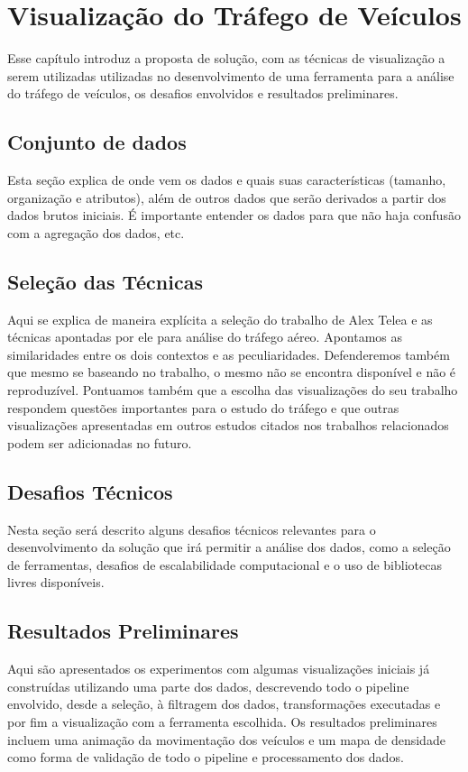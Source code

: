 \chapter{Visualização do Tráfego de Veículos}
\label{cap:visualizacao}

Esse capítulo introduz a proposta de solução, com as técnicas de visualização a
serem utilizadas utilizadas no desenvolvimento de uma ferramenta para a análise
do tráfego de veículos, os desafios envolvidos e resultados preliminares.

\section{Conjunto de dados}

Esta seção explica de onde vem os dados e quais suas características (tamanho, organização e atributos), além
de outros dados que serão derivados a partir dos dados brutos iniciais. É importante entender
os dados para que não haja confusão com a agregação dos dados, etc.

\section{Seleção das Técnicas}

Aqui se explica de maneira explícita a seleção do trabalho de Alex Telea e as técnicas
apontadas por ele para análise do tráfego aéreo. Apontamos as similaridades entre
os dois contextos e as peculiaridades. Defenderemos também que mesmo se baseando
no trabalho, o mesmo não se encontra disponível e não é reproduzível. Pontuamos também
que a escolha das visualizações do seu trabalho respondem questões importantes
para o estudo do tráfego e que outras visualizações apresentadas em outros estudos citados
nos trabalhos relacionados podem ser adicionadas no futuro.

\section{Desafios Técnicos}

Nesta seção será descrito alguns desafios técnicos relevantes para o desenvolvimento da solução
que irá permitir a análise dos dados, como a seleção de ferramentas,
desafios de escalabilidade computacional e o uso de bibliotecas livres disponíveis.

\section{Resultados Preliminares}

Aqui são apresentados os experimentos com algumas visualizações iniciais já construídas
utilizando uma parte dos dados, descrevendo todo o pipeline envolvido, desde a seleção, à filtragem dos dados,
transformações executadas e por fim a visualização com a ferramenta escolhida.
Os resultados preliminares incluem uma animação da movimentação dos veículos e um mapa de densidade
como forma de validação de todo o pipeline e processamento dos dados.

